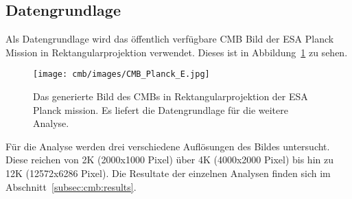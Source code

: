 \subsection{Datengrundlage}
Als Datengrundlage wird das öffentlich verfügbare CMB Bild der ESA Planck 
Mission in Rektangularprojektion \cite{cmb:public_equirectangular} 
verwendet. Dieses ist in Abbildung~\ref{fig:cmb-rectangular} zu sehen.

\begin{figure}
	\centering
	\texttt{[image: cmb/images/CMB\_Planck\_E.jpg]}
	\caption{Das generierte Bild des CMBs in Rektangularprojektion der ESA 
		Planck mission. Es liefert die Datengrundlage für die weitere Analyse.}
	\label{fig:cmb-rectangular}
\end{figure}

Für die Analyse werden drei verschiedene Auflösungen des Bildes untersucht. 
Diese reichen von 2K (2000x1000 Pixel) über 4K (4000x2000 Pixel) bis hin zu 12K 
(12572x6286 Pixel). Die Resultate der einzelnen Analysen finden sich im 
Abschnitt~\ref{subsec:cmb:results}.
